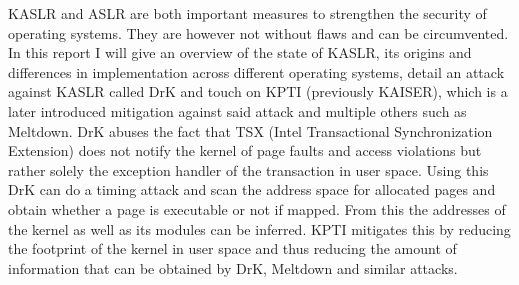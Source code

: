 KASLR and ASLR are both important measures to strengthen the security of operating systems.
They are however not without flaws and can be circumvented.
In this report I will give an overview of the state of KASLR, its origins and differences in implementation across different operating systems, detail an attack against KASLR called DrK and touch on KPTI (previously KAISER), which is a later introduced mitigation against said attack and multiple others such as Meltdown.
DrK abuses the fact that TSX (Intel Transactional Synchronization Extension) does not notify the kernel of page faults and access violations but rather solely the exception handler of the transaction in user space. Using this DrK can do a timing attack and scan the address space for allocated pages and obtain whether a page is executable or not if mapped.
From this the addresses of the kernel as well as its modules can be inferred.
KPTI mitigates this by reducing the footprint of the kernel in user space and thus reducing the amount of information that can be obtained by DrK, Meltdown and similar attacks.

